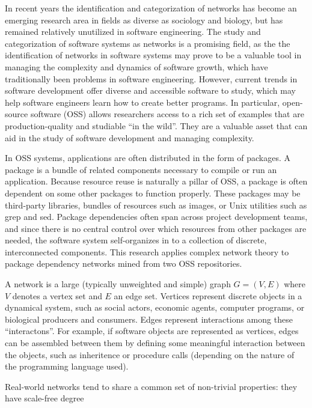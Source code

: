 \documentclass{elsart}
\begin{document}
\par In recent years the identification and categorization of networks has become an emerging research area in fields 
as diverse as sociology and biology, but has remained relatively unutilized in software engineering. The study and categorization of software systems as networks is a promising field, as the the identification of 
networks in software systems may prove to be a valuable tool in managing the complexity and dynamics of software 
growth, which have traditionally been problems in software engineering. However, current trends in software 
development offer diverse 
and accessible software to study, which may help software engineers learn how to create better programs.  In 
particular, open-source software (OSS) allows researchers access to a rich set 
of examples that are production-quality and studiable ``in the wild''. They are a valuable asset that 
can aid in the 
study of software development and managing complexity. 
\par In OSS systems, applications are often distributed in the form of packages. A package is a bundle 
of related components necessary to compile or run an application. Because resource reuse is naturally a pillar of 
OSS, a package is often dependent on some other packages to function properly. These packages may be third-party 
libraries, bundles of resources such as images, or Unix utilities such as grep and sed. Package dependencies often 
span 
across project development teams, and since there is no central control over which resources from other packages are needed, the software system 
self-organizes in to a collection of discrete, interconnected components. This research applies complex network 
theory to package dependency networks mined from two OSS repositories. 
\par A network is a large (typically unweighted and simple) graph $ G=(V,E) $ where $ V $ denotes a vertex 
set and $ E $ an edge set. Vertices represent discrete objects in a dynamical system, such as social actors, economic agents, computer programs, or biological 
producers and consumers. Edges represent interactions among these ``interactons''. For example, if software objects 
are represented as vertices, edges can be assembled between them by defining some meaningful interaction between 
the objects, such as inheritence or procedure calls (depending on the nature of the programming language used).
\par Real-world networks tend to share a common set of non-trivial properties: they have scale-free degree 
\end{document}
